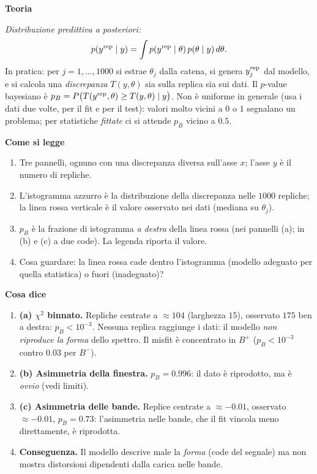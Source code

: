 \documentclass[10.5pt,a4paper]{article}
\newcommand{\sez}[1]{\par\Needspace{6\baselineskip}\medskip\noindent\textbf{\large #1}\par\nopagebreak\smallskip}
\begin{document}
\sez{Teoria}
\emph{Distribuzione predittiva a posteriori:}
\[
p(y^{\rm rep}\mid y)=\int p(y^{\rm rep}\mid\theta)\,p(\theta\mid y)\,d\theta.
\]
In pratica: per $j=1,\dots,1000$ si estrae $\theta_j$ dalla catena, si genera $y^{\rm rep}_j$ dal modello, e si calcola una \emph{discrepanza} $T(y,\theta)$ sia sulla replica sia sui dati. Il $p$-value bayesiano è $p_B=P\big(T(y^{\rm rep},\theta)\ge T(y,\theta)\mid y\big)$. Non è uniforme in generale (usa i dati due volte, per il fit e per il test): valori molto vicini a $0$ o $1$ segnalano un problema; per statistiche \emph{fittate} ci si attende $p_B$ vicino a $0.5$.

\sez{Come si legge}
\begin{enumerate}
\item Tre pannelli, ognuno con una discrepanza diversa sull'asse $x$; l'asse $y$ è il numero di repliche.
\item L'istogramma azzurro è la distribuzione della discrepanza nelle $1000$ repliche; la linea rossa verticale è il valore osservato nei dati (mediana su $\theta_j$).
\item $p_B$ è la frazione di istogramma \emph{a destra} della linea rossa (nei pannelli (a); in (b) e (c) a due code). La legenda riporta il valore.
\item Cosa guardare: la linea rossa cade dentro l'istogramma (modello adeguato per quella statistica) o fuori (inadeguato)?
\end{enumerate}

\sez{Cosa dice}
\begin{enumerate}
\item \textbf{(a) $\chi^2$ binnato.} Repliche centrate a $\approx104$ (larghezza $15$), osservato $175$ ben a destra: $p_B<10^{-3}$. Nessuna replica raggiunge i dati: il modello \emph{non riproduce la forma} dello spettro. Il misfit è concentrato in $B^+$ ($p_B<10^{-3}$ contro $0.03$ per $B^-$).
\item \textbf{(b) Asimmetria della finestra.} $p_B=0.996$: il dato è riprodotto, ma è \emph{ovvio} (vedi limiti).
\item \textbf{(c) Asimmetria delle bande.} Replice centrate a $\approx-0.01$, osservato $\approx-0.01$, $p_B=0.73$: l'asimmetria nelle bande, che il fit vincola meno direttamente, è riprodotta.
\item \textbf{Conseguenza.} Il modello descrive male la \emph{forma} (code del segnale) ma non mostra distorsioni dipendenti dalla carica nelle bande.
\end{enumerate}
\end{document}
